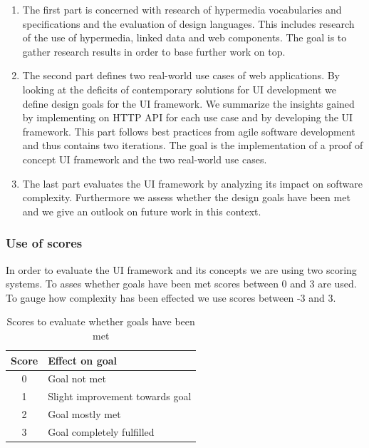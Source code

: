 \begin{enumerate}
\item The first part is concerned with research of hypermedia vocabularies and specifications and the evaluation of design languages. This includes research of the use of hypermedia, linked data and web components. The goal is to gather research results in order to base further work on top.
\item The second part defines two real-world use cases of web applications. By looking at the deficits of contemporary solutions for UI development we define design goals for the UI framework. We summarize the insights gained by implementing on HTTP API for each use case and by developing the UI framework. This part follows best practices from agile software development and thus contains two iterations. The goal is the implementation of a proof of concept UI framework and the two real-world use cases.
\item The last part evaluates the UI framework by analyzing its impact on software complexity. Furthermore we assess whether the design goals have been met and we give an outlook on future work in this context.
\end{enumerate}

\subsubsection{Use of scores}
In order to evaluate the UI framework and its concepts we are using two scoring systems. To asses whether goals have been met scores between 0 and 3 are used. To gauge how complexity has been effected we use scores between -3 and 3.

\begin{table}[]
  \begin{center}
    \begin{tabular}{|c|l|}
      \hline
      Score & Effect on goal \\
      \hline
      0 & Goal not met \\
      1 & Slight improvement towards goal \\
      2 & Goal mostly met \\
      3 & Goal completely fulfilled \\
      \hline
    \end{tabular}
    \caption{Scores to evaluate whether goals have been met}
  \end{center}
\end{table}

